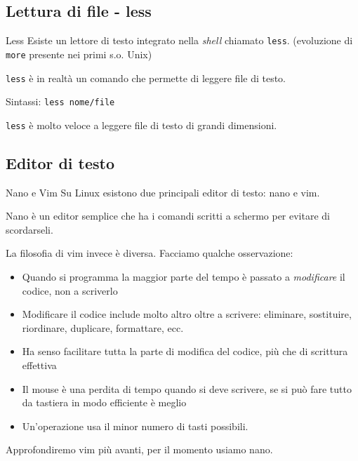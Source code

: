 \subsection{Lettura di file - less}
\begin{frame}{Less}
  Esiste un lettore di testo integrato nella \textit{shell} chiamato 
  \texttt{less}. (evoluzione di \texttt{more} presente nei primi s.o. Unix)\bigskip

  \texttt{less} è in realtà un comando che permette di leggere file di 
  testo.\bigskip

  Sintassi: \texttt{less nome/file}\bigskip

  \texttt{less} è molto veloce a leggere file di testo di grandi dimensioni.
\end{frame}

\subsection{Editor di testo}
\begin{frame}[fragile]{Nano e Vim}
  Su Linux esistono due principali editor di testo: nano e vim. \smallskip

  Nano è un editor semplice che ha i comandi scritti a schermo per evitare di
  scordarseli. \smallskip

  La filosofia di vim invece è diversa. Facciamo qualche osservazione:
  \begin{itemize}
    \item Quando si programma la maggior parte del tempo è passato a 
      \textit{modificare} il codice, non a scriverlo

    \item Modificare il codice include molto altro oltre a scrivere: eliminare,
      sostituire, riordinare, duplicare, formattare, ecc.

    \item Ha senso facilitare tutta la parte di modifica del codice, più che 
      di scrittura effettiva

    \item Il mouse è una perdita di tempo quando si deve scrivere, se si può
      fare tutto da tastiera in modo efficiente è meglio

    \item Un'operazione usa il minor numero di tasti possibili.
  \end{itemize}

  Approfondiremo vim più avanti, per il momento usiamo nano.
\end{frame}


